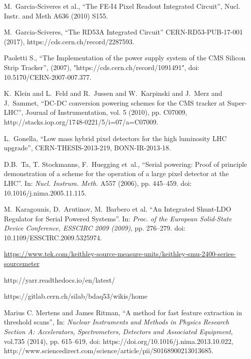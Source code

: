 \begin{thebibliography}{1}
 M.~Garcia-Sciveres et al., ``The FE-I4 Pixel Readout
  Integrated Circuit'', Nucl. Instr. and Meth A636 (2010) S155.

 M.~Garcia-Sciveres, ``The RD53A Integrated Circuit''
  CERN-RD53-PUB-17-001 (2017), https://cds.cern.ch/record/2287593.

 Paoletti S., ``The Implementation of the power supply system of the CMS Silicon Strip Tracker'', (2007), "https://cds.cern.ch/record/1091491", doi: 10.5170/CERN-2007-007.377.

% 
K.~Klein and L.~Feld and R.~Jussen and W.~Karpinski and J.~Merz and J.~Sammet, ``DC-DC conversion powering schemes for the CMS tracker at Super-LHC'', Journal of Instrumentation, vol. 5 (2010), pp. C07009, http://stacks.iop.org/1748-0221/5/i=07/a=C07009.

 L.~Gonella, ``Low mass hybrid pixel detectors for the high luminosity LHC upgrade'', CERN-THESIS-2013-219, BONN-IR-2013-18.
  
 D.B.~Ta, T. Stockmanns, F.~Huegging et~al., ``Serial powering: Proof of principle demonstration of a scheme for the operation of a large pixel detector at the LHC''. In: \textit{Nucl. Instrum. Meth.} A557 (2006), pp. 445--459. doi: 10.1016/j.nima.2005.11.115.

 M.~Karagounis, D.~Arutinov, M.~Barbero et al. ``An Integrated Shunt-LDO Regulator for Serial Powered Systems''. In: \textit{Proc. of the European Solid-State Device Conference,
ESSCIRC 2009 (2009)}, pp. 276–279. doi: 10.1109/ESSCIRC.2009.5325974.

 \url{https://www.tek.com/keithley-source-measure-units/keithley-smu-2400-series-sourcemeter}

 http://yarr.readthedocs.io/en/latest/

 https://gitlab.cern.ch/silab/bdaq53/wikis/home

 Marius C. Mertens and James Ritman, ``A method for fast feature extraction in threshold scans'', 
In: \textit{Nuclear Instruments and Methods in Physics Research Section A: Accelerators, Spectrometers, Detectors and Associated Equipment}, 
vol.735 (2014), pp. 615--619, doi: https://doi.org/10.1016/j.nima.2013.10.022, 
http://www.sciencedirect.com/science/article/pii/S0168900213013685.


\end{thebibliography}
